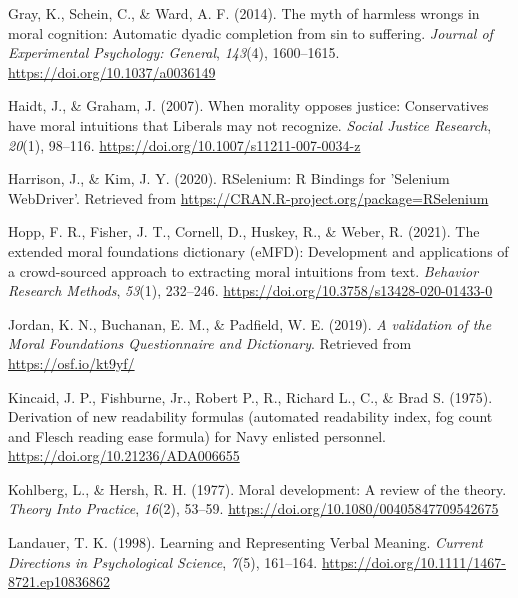 \documentclass[
  english,
  man,floatsintext]{apa6}
\newlength{\cslhangindent}
\newlength{\cslentryspacingunit} %
\newenvironment{CSLReferences}[2] %
 {%
  \setlength{\parindent}{0pt}
  \ifodd #1
  \let\oldpar\par
  \def\par{\hangindent=\cslhangindent\oldpar}
  \fi
  \setlength{\parskip}{#2\cslentryspacingunit}
 }%
 {}
\begin{document}
\begin{CSLReferences}{1}{0}
\leavevmode{}%
Gray, K., Schein, C., \& Ward, A. F. (2014). The myth of harmless wrongs in moral cognition: Automatic dyadic completion from sin to suffering. \emph{Journal of Experimental Psychology: General}, \emph{143}(4), 1600--1615. \url{https://doi.org/10.1037/a0036149}

\leavevmode{}%
Haidt, J., \& Graham, J. (2007). {When morality opposes justice: Conservatives have moral intuitions that Liberals may not recognize}. \emph{Social Justice Research}, \emph{20}(1), 98--116. \url{https://doi.org/10.1007/s11211-007-0034-z}

\leavevmode{}%
Harrison, J., \& Kim, J. Y. (2020). {RSelenium}: {R} {Bindings} for '{Selenium} {WebDriver}'. Retrieved from \url{https://CRAN.R-project.org/package=RSelenium}

\leavevmode{}%
Hopp, F. R., Fisher, J. T., Cornell, D., Huskey, R., \& Weber, R. (2021). The extended moral foundations dictionary (eMFD): Development and applications of a crowd-sourced approach to extracting moral intuitions from text. \emph{Behavior Research Methods}, \emph{53}(1), 232--246. \url{https://doi.org/10.3758/s13428-020-01433-0}

\leavevmode{}%
Jordan, K. N., Buchanan, E. M., \& Padfield, W. E. (2019). \emph{{A validation of the Moral Foundations Questionnaire and Dictionary}}. Retrieved from \url{https://osf.io/kt9yf/}

\leavevmode{}%
Kincaid, J. P., Fishburne, Jr., Robert P., R., Richard L., C., \& Brad S. (1975). Derivation of new readability formulas (automated readability index, fog count and {F}lesch reading ease formula) for {N}avy enlisted personnel. \url{https://doi.org/10.21236/ADA006655}

\leavevmode{}%
Kohlberg, L., \& Hersh, R. H. (1977). {Moral development: A review of the theory}. \emph{Theory Into Practice}, \emph{16}(2), 53--59. \url{https://doi.org/10.1080/00405847709542675}

\leavevmode{}%
Landauer, T. K. (1998). {Learning and Representing Verbal Meaning}. \emph{Current Directions in Psychological Science}, \emph{7}(5), 161--164. \url{https://doi.org/10.1111/1467-8721.ep10836862}


\end{CSLReferences}
\end{document}
